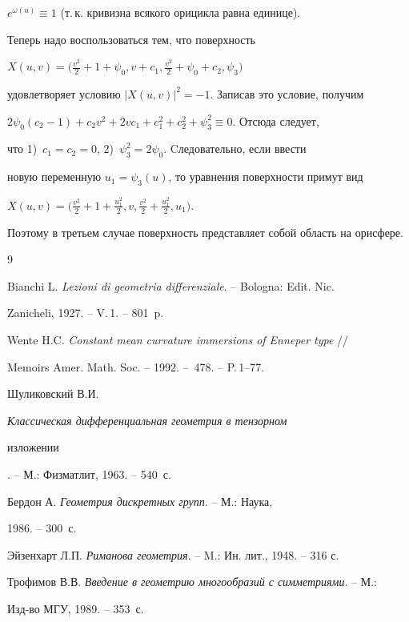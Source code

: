 \begin{pf}
$e^{\omega (u)} \equiv 1$ (т.\,к. кривизна всякого орицикла равна единице).


Теперь надо воспользоваться тем, что поверхность


$X(u,v)=\big(\frac{v^2}{2}+1+\psi_0,v+c_1,\frac{v^2}{2}+


\psi_0+c_2,\psi_3\big)$


удовлетворяет условию $|X(u,v)|^2=-1$. Записав это условие, получим


$2\psi_0(c_2-1)+c_2v^2+2vc_1+c_1^2+c_2^2+\psi_3^2\equiv 0$. Отсюда следует,


что 1)~$c_1=c_2=0$, 2)~$\psi_3^2=2\psi_0$. Cледовательно, если ввести


новую переменную $u_1=\psi_3(u)$, то уравнения поверхности примут вид


$X(u,v)=\big(\frac{v^2}{2}+1+\frac{u_1^2}{2},v,\frac{v^2}{2}+


\frac{u_1^2}{2},u_1\big)$.


Поэтому в третьем случае поверхность представляет собой область на орисфере.


\end{pf}





\begin{thebibliography}{9}







Bianchi L. {\em Lezioni di geometria differenziale}. -- Bologna: Edit. Nic.


Zanicheli, 1927. -- V.\,1. -- 801~p.




Wente H.C. {\em Constant mean curvature immersions of Enneper type} //


Memoirs Amer. Math. Soc. -- 1992. -- \No\,478. -- P.\,1--77.




Шуликовский В.И. {\em Классическая дифференциальная геометрия в тензорном


изложении}. -- М.: Физматлит, 1963. -- 540~с.




Бердон А. {\em Геометрия дискретных групп}. -- М.: Наука,


1986. -- 300~с.




Эйзенхарт Л.П. {\em Риманова геометрия}. -- M.: Ин. лит., 1948. -- 316 с.




Трофимов В.В. {\em Введение в геометрию многообразий с симметриями}. -- М.:


Изд-во МГУ, 1989. -- 353~с.








\end{thebibliography}





